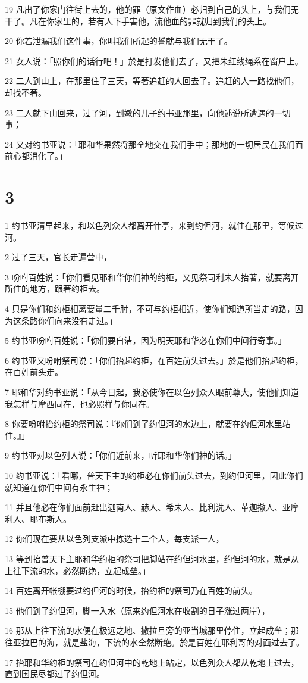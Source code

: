 \par 19 凡出了你家门往街上去的，他的罪（原文作血）必归到自己的头上，与我们无干了。凡在你家里的，若有人下手害他，流他血的罪就归到我们的头上。
\par 20 你若泄漏我们这件事，你叫我们所起的誓就与我们无干了。
\par 21 女人说：「照你们的话行吧！」於是打发他们去了，又把朱红线绳系在窗户上。
\par 22 二人到山上，在那里住了三天，等著追赶的人回去了。追赶的人一路找他们，却找不著。
\par 23 二人就下山回来，过了河，到嫩的儿子约书亚那里，向他述说所遭遇的一切事；
\par 24 又对约书亚说：「耶和华果然将那全地交在我们手中；那地的一切居民在我们面前心都消化了。」

\chapter{3}

\par 1 约书亚清早起来，和以色列众人都离开什亭，来到约但河，就住在那里，等候过河。
\par 2 过了三天，官长走遍营中，
\par 3 吩咐百姓说：「你们看见耶和华你们神的约柜，又见祭司利未人抬著，就要离开所住的地方，跟著约柜去。
\par 4 只是你们和约柜相离要量二千肘，不可与约柜相近，使你们知道所当走的路，因为这条路你们向来没有走过。」
\par 5 约书亚吩咐百姓说：「你们要自洁，因为明天耶和华必在你们中间行奇事。」
\par 6 约书亚又吩咐祭司说：「你们抬起约柜，在百姓前头过去。」於是他们抬起约柜，在百姓前头走。
\par 7 耶和华对约书亚说：「从今日起，我必使你在以色列众人眼前尊大，使他们知道我怎样与摩西同在，也必照样与你同在。
\par 8 你要吩咐抬约柜的祭司说：『你们到了约但河的水边上，就要在约但河水里站住。』」
\par 9 约书亚对以色列人说：「你们近前来，听耶和华你们神的话。」
\par 10 约书亚说：「看哪，普天下主的约柜必在你们前头过去，到约但河里，因此你们就知道在你们中间有永生神；
\par 11 并且他必在你们面前赶出迦南人、赫人、希未人、比利洗人、革迦撒人、亚摩利人、耶布斯人。
\par 12 你们现在要从以色列支派中拣选十二个人，每支派一人，
\par 13 等到抬普天下主耶和华约柜的祭司把脚站在约但河水里，约但河的水，就是从上往下流的水，必然断绝，立起成垒。」
\par 14 百姓离开帐棚要过约但河的时候，抬约柜的祭司乃在百姓的前头。
\par 15 他们到了约但河，脚一入水（原来约但河水在收割的日子涨过两岸），
\par 16 那从上往下流的水便在极远之地、撒拉旦旁的亚当城那里停住，立起成垒；那往亚拉巴的海，就是盐海，下流的水全然断绝。於是百姓在耶利哥的对面过去了。
\par 17 抬耶和华约柜的祭司在约但河中的乾地上站定，以色列众人都从乾地上过去，直到国民尽都过了约但河。

